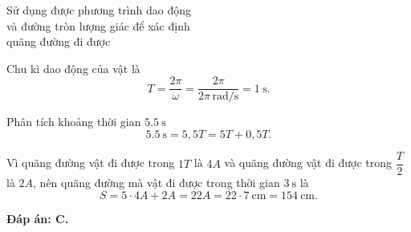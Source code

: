 \begin{dang}{Sử dụng được phương trình dao động\\ và đường tròn lượng giác để xác định\\ quãng đường đi được}
{		Chu kì dao động của vật là
		\begin{equation*}
			T=\dfrac{2\pi}{\omega}=\dfrac{2\pi}{2\pi\,\text{rad/s}}=\SI{1}{\second}.
		\end{equation*}
		
		Phân tích khoảng thời gian $\SI{5,5}{\second}$
		\begin{equation*}
			\SI{5,5}{\second}=5,5T=5T+0,5T.
		\end{equation*}
		
		Vì quãng đường vật đi được trong $1T$ là $4A$ và quãng đường vật đi được trong $\dfrac{T}{2}$ là $2A$, nên quãng đường mà vật đi được trong thời gian $\SI{3}{\second}$ là
		\begin{equation*}
			S=5\cdot4A+2A=22A=22\cdot\SI{7}{\centi\meter}=\SI{154}{\centi\meter}.
		\end{equation*}
		
		\textbf{Đáp án: C.}
	}
	
\end{dang}
